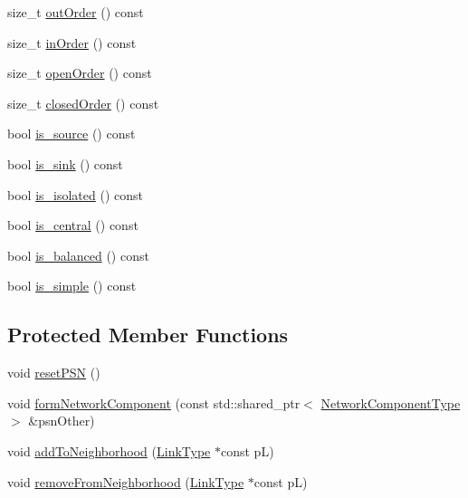 \begin{DoxyCompactItemize}
size\+\_\+t \hyperlink{classmodel_1_1_network_node_a91626fb23950622caf5b97a0d402533b}{out\+Order} () const 
\item 
size\+\_\+t \hyperlink{classmodel_1_1_network_node_ac07000ec45e136633b30a9d1561bca1a}{in\+Order} () const 
\item 
size\+\_\+t \hyperlink{classmodel_1_1_network_node_a32bf0d97408f6483fd8afcfee93251a9}{open\+Order} () const 
\item 
size\+\_\+t \hyperlink{classmodel_1_1_network_node_a4241f925b69fd36d20b8f4a5c826480a}{closed\+Order} () const 
\item 
bool \hyperlink{classmodel_1_1_network_node_a706d423eb2e10d8ddd1caab8b2b308d3}{is\+\_\+source} () const 
\item 
bool \hyperlink{classmodel_1_1_network_node_a307669e46339d2d156a82bf330899f0f}{is\+\_\+sink} () const 
\item 
bool \hyperlink{classmodel_1_1_network_node_a2c9f5ce0757d33a51bae68c8490b7b84}{is\+\_\+isolated} () const 
\item 
bool \hyperlink{classmodel_1_1_network_node_a3a970f03607881437832c27a666755fa}{is\+\_\+central} () const 
\item 
bool \hyperlink{classmodel_1_1_network_node_ae2a7f2cc7358b5f763e0b55128f486b7}{is\+\_\+balanced} () const 
\item 
bool \hyperlink{classmodel_1_1_network_node_a3e282e435cfdbed567c90c8c74130c53}{is\+\_\+simple} () const 
\end{DoxyCompactItemize}
\subsection*{Protected Member Functions}
\begin{DoxyCompactItemize}
\item 
void \hyperlink{classmodel_1_1_network_node_aa660fedde9425a4b0544c1a85768dffb}{reset\+P\+S\+N} ()
\item 
void \hyperlink{classmodel_1_1_network_node_a9c35a8b43fa682e0e86665c8910882cc}{form\+Network\+Component} (const std\+::shared\+\_\+ptr$<$ \hyperlink{_network_typedefs_8h_ace62a87e27b01659142c49a8712f3dc9}{Network\+Component\+Type} $>$ \&psn\+Other)
\item 
void \hyperlink{classmodel_1_1_network_node_a09198bd726f5cb978fe6934ddc872ea2}{add\+To\+Neighborhood} (\hyperlink{_spline_node_base__corder0_8h_ab09ccc0af6ea9402dfef7b0eac55cff3}{Link\+Type} $\ast$const p\+L)
\item 
void \hyperlink{classmodel_1_1_network_node_a3d3e04ec0df0049a15cff19f4d2da5f3}{remove\+From\+Neighborhood} (\hyperlink{_spline_node_base__corder0_8h_ab09ccc0af6ea9402dfef7b0eac55cff3}{Link\+Type} $\ast$const p\+L)
\end{DoxyCompactItemize}
